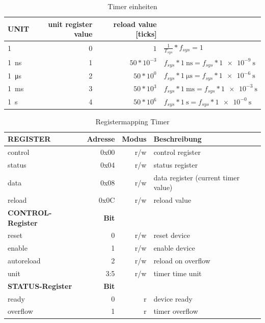 \begin{table}[!htbp]
	\bigskip
	\centering
	\begin{tabular}{  l | r | r | l }
		UNIT & unit register value & reload value [ticks] \\
		\hline
		\SI{1}{\tick}  & 0 & $1$ & $  \frac{1}{T_{sys}} * f_{sys} = 1 $ \\
		\SI{1}{\nano\second} & 1 & $ 50 * 10^{-3} $ & $ f_{sys} * \SI{1}{\nano\second} = f_{sys} * \SI{1e-9}{\second} $ \\
		\SI{1}{\micro\second} & 2 & $ 50 * 10^0 $ & $ f_{sys} * \SI{1}{\micro\second} = f_{sys} * \SI{1e-6}{\second} $ \\
		\SI{1}{\milli\second} & 3 & $ 50 * 10^3 $ & $ f_{sys} * \SI{1}{\milli\second} = f_{sys} * \SI{1e-3}{\second} $ \\
		\SI{1}{\second} & 4 & $ 50 * 10^6 $  & $ f_{sys} * \SI{1}{\second} = f_{sys} * \SI{1e-0}{\second} $\\
		\hline
	\end{tabular}
	
	\caption{Timer einheiten}
	\label{tab:timer_units}
\end{table}

\begin{table}[!htbp]
	\bigskip
	\centering
	\begin{tabular}{  l | r | r | l }
		\textbf{REGISTER} & \textbf{Adresse} & \textbf{Modus} & \textbf{Beschreibung} \\
		\hline
		control & 0x00 & r/w & control register \\
		status & 0x04 & r/w & status register \\
		data & 0x08 & r/w & data register (current timer value) \\
		reload & 0x0C & r/w & reload value \\
		\hline		
		\textbf{CONTROL-Register} & \textbf{Bit} & & \\
		\hline
		reset & 0 & r/w & reset device \\
		enable & 1 & r/w & enable device \\
		autoreload & 2 & r/w & reload on overflow \\
		unit & 3:5 & r/w & timer time unit \\
		\hline		
		\textbf{STATUS-Register} & \textbf{Bit} & & \\
		\hline
		ready & 0 & r & device ready \\
		overflow & 1 & r & timer overflow \\
		\hline
	\end{tabular}
	
	\caption{Registermapping Timer}
	\label{tab:timer_reg_map}
\end{table}


